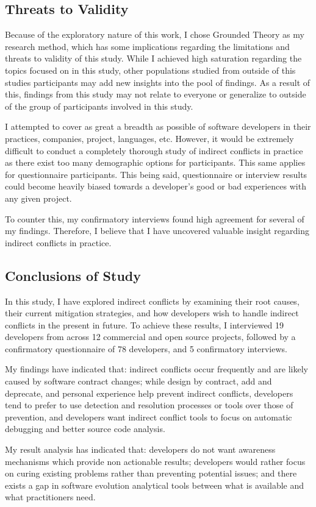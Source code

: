 \subsection{Threats to Validity}
Because of the exploratory nature of this work, I chose Grounded Theory as my research method, which has some implications regarding the
limitations and threats to validity of this study. While I achieved high saturation regarding the topics focused on in this study, other
populations studied from outside of this studies participants may add new insights into the pool of findings. As a result of this, findings
from this study may not relate to everyone or generalize to outside of the group of participants involved in this study.

I attempted to cover as great a breadth as possible of software developers in their practices, companies,
project, languages, etc. However, it would be extremely difficult to conduct a completely thorough study of indirect conflicts in practice
as there exist too many demographic options for participants. This same applies for questionnaire participants. This being said, questionnaire 
or interview results could become heavily biased towards a developer's good or bad experiences with any given project.

To counter this, my confirmatory interviews found high agreement for several of my findings. Therefore, I believe that
I have uncovered valuable insight regarding indirect conflicts in practice.

\subsection{Conclusions of Study}

In this study, I have explored indirect conflicts by examining their root causes, their current mitigation strategies, and how developers
wish to handle indirect conflicts in the present in future. To achieve these results, I interviewed 19 developers from across 12 commercial 
and open source projects, followed by a confirmatory questionnaire of 78 developers, and 5 confirmatory interviews.

My findings have indicated that:
indirect conflicts occur frequently and are likely caused by software contract changes;
while design by contract, add and deprecate, and personal experience help prevent indirect conflicts,
developers tend to prefer to use detection and resolution processes or tools
over those of prevention, and developers want indirect conflict tools to focus on automatic debugging and better source code analysis.

My result analysis has indicated that: developers do not want awareness mechanisms which provide non actionable results; developers
would rather focus on curing existing problems rather than preventing potential issues;
and there exists a gap in software evolution analytical tools between what is available and what practitioners need.
